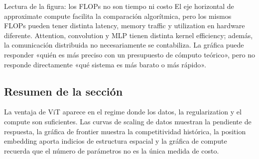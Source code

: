 \begin{knowledgebox}{Lectura de la figura: los FLOPs no son tiempo ni costo}
El eje horizontal de approximate compute facilita la comparación algorítmica, pero los mismos FLOPs pueden tener distinta latency, memory traffic y utilization en hardware diferente. Attention, convolution y MLP tienen distinta kernel efficiency; además, la comunicación distribuida no necesariamente se contabiliza. La gráfica puede responder «quién es más preciso con un presupuesto de cómputo teórico», pero no responde directamente «qué sistema es más barato o más rápido».
\end{knowledgebox}

\subsection{Resumen de la sección}

La ventaja de ViT aparece en el regime donde los datos, la regularization y el compute son suficientes. Las curvas de scaling de datos muestran la pendiente de respuesta, la gráfica de frontier muestra la competitividad histórica, la position embedding aporta indicios de estructura espacial y la gráfica de compute recuerda que el número de parámetros no es la única medida de costo.
